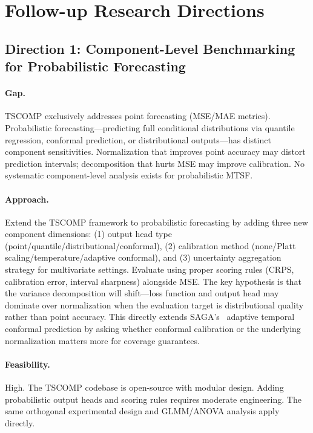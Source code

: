 \documentclass[11pt,a4paper]{article}
\begin{document}
\section{Follow-up Research Directions}

\subsection{Direction 1: Component-Level Benchmarking for Probabilistic Forecasting}

\paragraph{Gap.} TSCOMP exclusively addresses point forecasting (MSE/MAE metrics). Probabilistic forecasting---predicting full conditional distributions via quantile regression, conformal prediction, or distributional outputs---has distinct component sensitivities. Normalization that improves point accuracy may distort prediction intervals; decomposition that hurts MSE may improve calibration. No systematic component-level analysis exists for probabilistic MTSF.

\paragraph{Approach.} Extend the TSCOMP framework to probabilistic forecasting by adding three new component dimensions: (1) output head type (point/quantile/distributional/conformal), (2) calibration method (none/Platt scaling/temperature/adaptive conformal), and (3) uncertainty aggregation strategy for multivariate settings. Evaluate using proper scoring rules (CRPS, calibration error, interval sharpness) alongside MSE. The key hypothesis is that the variance decomposition will shift---loss function and output head may dominate over normalization when the evaluation target is distributional quality rather than point accuracy. This directly extends SAGA's~\cite{saga2026} adaptive temporal conformal prediction by asking whether conformal calibration or the underlying normalization matters more for coverage guarantees.

\paragraph{Feasibility.} High. The TSCOMP codebase is open-source with modular design. Adding probabilistic output heads and scoring rules requires moderate engineering. The same orthogonal experimental design and GLMM/ANOVA analysis apply directly.
\end{document}
